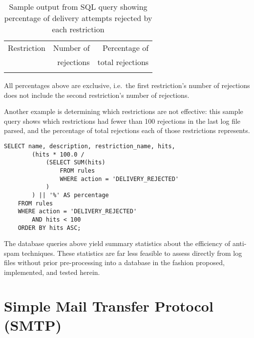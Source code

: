 \begin{table}[ht]
    \caption{Sample output from SQL query showing percentage of delivery
    attempts rejected by each restriction}
    \empty{}\label{Sample output from SQL query}
    \begin{tabular}[]{lrr}
        \tabletopline{}%
        Restriction & Number of  & Percentage of    \\
                    & rejections & total rejections \\
        \tablemiddleline{}%
        
        \tablebottomline{}%
    \end{tabular}

    All percentages above are exclusive, i.e.\ the first restriction's
    number of rejections does not include the second restriction's number
    of rejections.

\end{table}


Another example is determining which restrictions are not effective: this
sample query shows which restrictions had fewer than 100 rejections in the
last log file parsed, and the percentage of total rejections each of those
restrictions represents.

\begin{verbatim}
SELECT name, description, restriction_name, hits,
        (hits * 100.0 /
            (SELECT SUM(hits)
                FROM rules
                WHERE action = 'DELIVERY_REJECTED'
            )
        ) || '%' AS percentage
    FROM rules
    WHERE action = 'DELIVERY_REJECTED'
        AND hits < 100
    ORDER BY hits ASC;
\end{verbatim}

The database queries above yield summary statistics about the efficiency of
anti-spam techniques.  These statistics are far less feasible to assess
directly from log files without prior pre-processing into a database in the
fashion proposed, implemented, and tested herein.

\section{Simple Mail Transfer Protocol (SMTP)}

\label{SMTP background}

